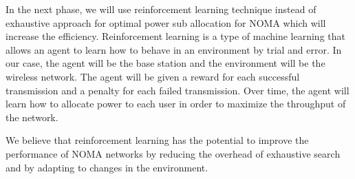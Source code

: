 \documentclass[conference]{IEEEtran}
\begin{document}
In the next phase, we will use reinforcement learning technique instead of exhaustive approach for optimal power sub allocation for NOMA which will increase the efficiency. Reinforcement learning is a type of machine learning that allows an agent to learn how to behave in an environment by trial and error. In our case, the agent will be the base station and the environment will be the wireless network. The agent will be given a reward for each successful transmission and a penalty for each failed transmission. Over time, the agent will learn how to allocate power to each user in order to maximize the throughput of the network.

We believe that reinforcement learning has the potential to improve the performance of NOMA networks by reducing the overhead of exhaustive search and by adapting to changes in the environment.



	
\end{document}
